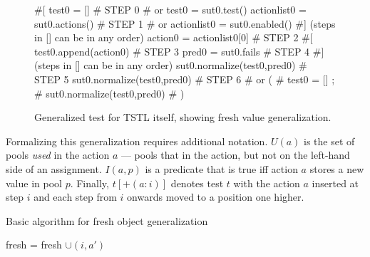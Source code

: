 \begin{figure}
{\scriptsize
\begin{code}
\textcolor{black!60}{\#[}
test0 = []                             \textcolor{black!60}{\# STEP 0}
\textcolor{black!60}{\#  or test0 = sut0.test() }
actionlist0 = sut0.actions()           \textcolor{black!60}{\# STEP 1}
\textcolor{black!60}{\#  or actionlist0 = sut0.enabled() }
\textcolor{black!60}{\#] (steps in [] can be in any order)}
action0 = actionlist0[0]               \textcolor{black!60}{\# STEP 2}
\textcolor{black!60}{\#[}
test0.append(action0)                  \textcolor{black!60}{\# STEP 3}
pred0 = sut0.fails                     \textcolor{black!60}{\# STEP 4}
\textcolor{black!60}{\#] (steps in [] can be in any order)}
sut0.normalize(test0,pred0)            \textcolor{black!60}{\# STEP 5}
sut0.normalize(test0,pred0)            \textcolor{black!60}{\# STEP 6}
\textcolor{black!60}{\#  or (}
\textcolor{black!60}{\#      test0 = []  ;}
\textcolor{black!60}{\#      sut0.normalize(test0,pred0) }
\textcolor{black!60}{\#     )}
\end{code}
}
\caption{Generalized test for TSTL itself, showing fresh value
  generalization.}
\label{fig:mislead}
\end{figure}

Formalizing this generalization requires additional notation.
$U(a)$ is the set of pools \emph{used} in the action $a$ --- pools that
in the action, but not on the left-hand side of an assignment.
$I(a,p)$ is a predicate that is true iff action $a$ stores a new value
in pool $p$.  Finally, $t[+(a: i)]$ denotes test $t$ with the action
$a$ inserted at step $i$ and each step from $i$ onwards moved to a
position one higher.

\begin{algorithm}
\caption{Basic algorithm for fresh object generalization}
\label{freshalg}
{%
\begin{algorithmic}[1]
\State fresh = fresh $\cup (i,a')$
\EndIf
\EndFor 
\EndFor
\EndFor
{}
\end{algorithmic}
}
\end{algorithm}

